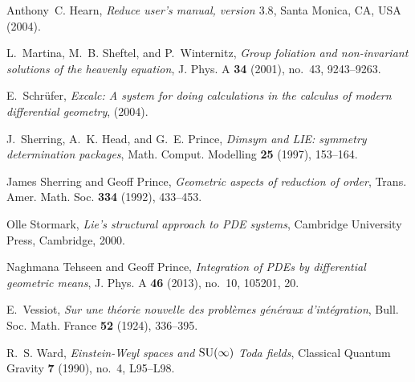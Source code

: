 \documentclass[a4paper, 11pt]{amsart}
\theoremstyle{definition}
\begin{document}
\begin{thebibliography}{10}
Anthony~C. Hearn, \emph{Reduce user's manual, version $3.8$}, Santa Monica, CA,
  USA (2004).

L.~Martina, M.~B. Sheftel, and P.~Winternitz, \emph{Group foliation and
  non-invariant solutions of the heavenly equation}, J. Phys. A \textbf{34}
  (2001), no.~43, 9243--9263.

E.~Schr\"{u}fer, \emph{Excalc: A system for doing calculations in the calculus
  of modern differential geometry},  (2004).

J.~Sherring, A.~K. Head, and G.~E. Prince, \emph{Dimsym and {LIE}: symmetry
  determination packages}, Math. Comput. Modelling \textbf{25} (1997),
  153--164.

James Sherring and Geoff Prince, \emph{Geometric aspects of reduction of
  order}, Trans. Amer. Math. Soc. \textbf{334} (1992), 433--453.

Olle Stormark, \emph{Lie's structural approach to {PDE} systems}, Cambridge
  University Press, Cambridge, 2000.

Naghmana Tehseen and Geoff Prince, \emph{Integration of {PDE}s by differential
  geometric means}, J. Phys. A \textbf{46} (2013), no.~10, 105201, 20.

E.~Vessiot, \emph{Sur une th\'eorie nouvelle des probl\`emes g\'en\'eraux
  d'int\'egration}, Bull. Soc. Math. France \textbf{52} (1924), 336--395.

R.~S. Ward, \emph{Einstein-{W}eyl spaces and {${\rm SU}(\infty)$} {T}oda
  fields}, Classical Quantum Gravity \textbf{7} (1990), no.~4, L95--L98.

\end{thebibliography}
\end{document}
